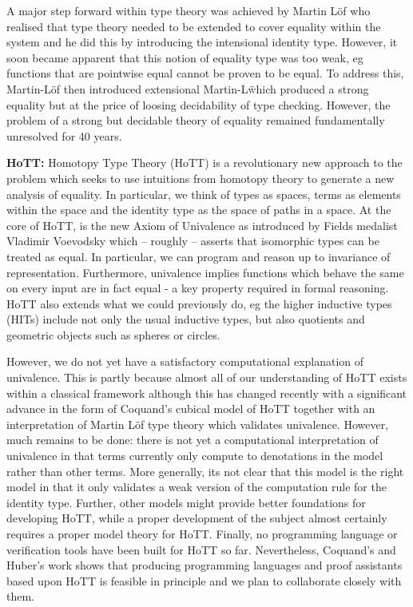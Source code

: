 \documentclass[a4paper,11pt]{article}
\begin{document}
A major step forward within type theory was achieved by Martin L\"of
who realised that type theory needed to be extended to cover equality
within the system and he did this by introducing the intensional identity type.
However, it soon became apparent that this notion of equality type was
too weak, eg functions that are pointwise equal cannot be proven to
be equal. To address this, Martin-L\"of then introduced extensional
Martin-L\" which produced a strong equality but at the price of
loosing decidability of type checking. However, the problem of a strong but
decidable theory of equality remained fundamentally unresolved for 40
years. 



{\bf HoTT:} Homotopy Type Theory (HoTT) is a revolutionary new
approach to the problem which seeks to use intuitions from homotopy
theory to generate a new analysis of equality. In particular, we think
of types as spaces, terms as elements within the space and the
identity type as the space of paths in a space. At the core of HoTT,
is the new Axiom of Univalence as introduced by Fields medalist
Vladimir Voevodsky which – roughly – asserts that isomorphic types can
be treated as equal. In particular, we can program and reason up to
invariance of representation. Furthermore, univalence implies
functions which behave the same on every input are in fact equal - a
key property required in formal reasoning. HoTT also extends what we
could previously do, eg the higher inductive types (HITs) include not
only the usual inductive types, but also quotients and geometric
objects such as spheres or circles.


However, we do not yet have a satisfactory computational explanation of
univalence. This is partly because almost all of our understanding of
HoTT exists within a classical framework although this has changed
recently with a significant advance in the form of Coquand's cubical
model of HoTT together with an interpretation of Martin L\"of type
theory which validates univalence. However, much remains to be done:
there is not yet a computational interpretation of univalence in that
terms currently only compute to denotations in the model rather than
other terms. More generally, its not clear that this model is the
right model in that it only validates a weak version of the
computation rule for the identity type. Further, other models might
provide better foundations for developing HoTT, while a proper
development of the subject almost certainly requires a proper model
theory for HoTT. Finally, no programming language or verification tools
have been built for HoTT so far. Nevertheless, Coquand's and Huber's
work shows that producing programming languages and proof assistants
based upon HoTT is feasible in principle and we plan to
collaborate closely with them.
\end{document}
